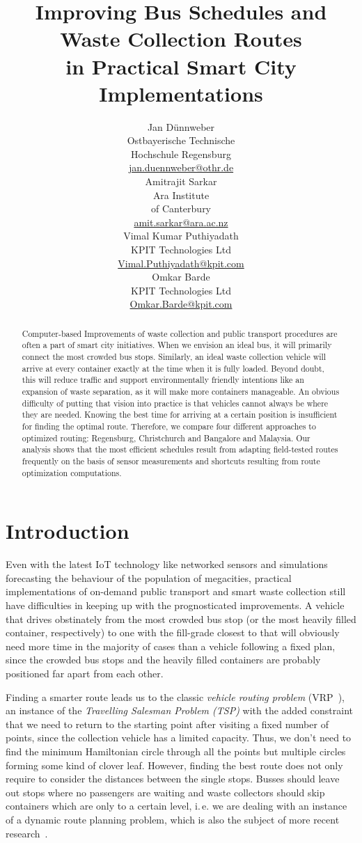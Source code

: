 \documentclass[10pt]{article}
\title{Improving Bus Schedules and Waste Collection Routes \\ in Practical Smart City Implementations}
\author{
  Jan D{\"u}nnweber  \\
  Ostbayerische Technische \\ Hochschule Regensburg \\
  {\underline{ jan.duennweber@othr.de} }\\\And 
  Amitrajit Sarkar \\
 Ara Institute \\ of Canterbury \\
  {\underline{amit.sarkar@ara.ac.nz}} \\\And
  Vimal Kumar Puthiyadath \\
 KPIT Technologies Ltd \\
  {\underline{Vimal.Puthiyadath@kpit.com}} \\\And
  Omkar Barde \\
 KPIT Technologies Ltd \\
  {\underline{Omkar.Barde@kpit.com}} 
 }
\date{}
\begin{document}
\maketitle
\begin{abstract}
Computer-based Improvements of waste collection and public transport procedures are 
often a part of smart city initiatives. When we envision an ideal bus, it will 
primarily connect the most crowded bus stops. Similarly, an ideal waste collection 
vehicle will arrive at every container exactly at the time when it is fully loaded. 
Beyond doubt, this will
reduce traffic and support environmentally friendly intentions like an expansion
of waste separation, as it will make more containers manageable.
An obvious difficulty of putting that vision into practice is that
vehicles cannot always be where they are needed.           
Knowing the best time for arriving at a certain position is insufficient for 
finding the optimal route.
Therefore, we compare four different approaches to optimized routing: 
Regensburg, Christchurch and Bangalore and Malaysia. Our analysis shows 
that the most efficient schedules           
result from adapting field-tested routes frequently on the basis of
sensor measurements and shortcuts resulting from route        
optimization computations.
\end{abstract}

\section{Introduction}
Even with the latest IoT technology like networked sensors and simulations
forecasting the behaviour of the population of megacities, practical implementations 
of on-demand public transport and smart waste collection still have difficulties 
in keeping up with the prognosticated improvements.
A vehicle that drives obstinately from the most crowded bus stop (or the 
most heavily filled container, respectively) to one with the fill-grade closest 
to that will obviously need more time in the majority of cases than a vehicle 
following a fixed plan, 
since the crowded bus stops and the heavily filled containers are probably 
positioned far apart from 
each other. 

Finding a smarter route leads us to the classic 
{\it vehicle routing problem} (VRP~\cite{Dantzig59}), an instance of the 
{\it Travelling Salesman Problem (TSP)} with the added constraint that we 
need to return to the starting point after visiting a fixed number of points, 
since the collection vehicle has a limited capacity. 
Thus, we don't need to find the minimum Hamiltonian
circle through all the points but multiple circles forming some kind of
clover leaf. However, finding the best route does not only require to consider the distances between the single stops. Busses should leave out stops where no
passengers are waiting and waste collectors should skip containers which are only 
to a certain level, i.\,e. we are dealing with an instance of a dynamic route 
planning problem, which is also the subject of more recent 
research~\cite{Chen16}.
\end{document}
